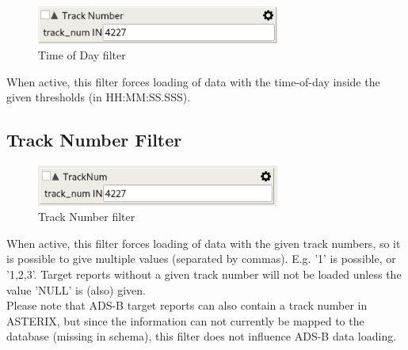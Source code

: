\begin{figure}[H]
  \center
    \includegraphics[width=8cm,frame]{figures/filter_tod.png}
  \caption{Time of Day filter}
\end{figure}

When active, this filter forces loading of data with the time-of-day inside the given thresholds (in HH:MM:SS.SSS).

\subsection{Track Number Filter}

\begin{figure}[H]
  \center
    \includegraphics[width=8cm,frame]{figures/filter_tracknum.png}
  \caption{Track Number filter}
\end{figure}

When active, this filter forces loading of data with the given track numbers, so it is possible to give multiple values (separated by commas). E.g. '1' is possible, or '1,2,3'. Target reports without a given track number will not be loaded unless the value 'NULL' is (also) given. \\

Please note that ADS-B target reports can also contain a track number in ASTERIX, but since the information can not currently be mapped to the database (missing in schema), this filter does not influence ADS-B data loading.

